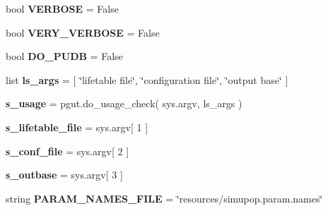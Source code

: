 \begin{DoxyCompactItemize}
\item 
bool {\bfseries V\+E\+R\+B\+O\+SE} = False\hypertarget{namespacenegui_1_1pgopsimupop_a96abe80c504eaf65df660c445e3acb51}{}\label{namespacenegui_1_1pgopsimupop_a96abe80c504eaf65df660c445e3acb51}

\item 
bool {\bfseries V\+E\+R\+Y\+\_\+\+V\+E\+R\+B\+O\+SE} = False\hypertarget{namespacenegui_1_1pgopsimupop_abf83ac5d296ea43e65ba3c2e4837b209}{}\label{namespacenegui_1_1pgopsimupop_abf83ac5d296ea43e65ba3c2e4837b209}

\item 
bool {\bfseries D\+O\+\_\+\+P\+U\+DB} = False\hypertarget{namespacenegui_1_1pgopsimupop_aad4ebdbadcdf46959a4fe2f34b95e88c}{}\label{namespacenegui_1_1pgopsimupop_aad4ebdbadcdf46959a4fe2f34b95e88c}

\item 
list {\bfseries ls\+\_\+args} = \mbox{[} \char`\"{}lifetable file\char`\"{}, \char`\"{}configuration file\char`\"{}, \char`\"{}output base\char`\"{} \mbox{]}\hypertarget{namespacenegui_1_1pgopsimupop_a46ea457904890dab8ede52052983692c}{}\label{namespacenegui_1_1pgopsimupop_a46ea457904890dab8ede52052983692c}

\item 
{\bfseries s\+\_\+usage} = pgut.\+do\+\_\+usage\+\_\+check( sys.\+argv, ls\+\_\+args )\hypertarget{namespacenegui_1_1pgopsimupop_a11e7f1bec9125f9d94dde7a90388d5bd}{}\label{namespacenegui_1_1pgopsimupop_a11e7f1bec9125f9d94dde7a90388d5bd}

\item 
{\bfseries s\+\_\+lifetable\+\_\+file} = sys.\+argv\mbox{[} 1 \mbox{]}\hypertarget{namespacenegui_1_1pgopsimupop_a35a54163d82dbd1ddbb96e7d1cf1ad92}{}\label{namespacenegui_1_1pgopsimupop_a35a54163d82dbd1ddbb96e7d1cf1ad92}

\item 
{\bfseries s\+\_\+conf\+\_\+file} = sys.\+argv\mbox{[} 2 \mbox{]}\hypertarget{namespacenegui_1_1pgopsimupop_a67afb09bc187a54d3173444bab6288e9}{}\label{namespacenegui_1_1pgopsimupop_a67afb09bc187a54d3173444bab6288e9}

\item 
{\bfseries s\+\_\+outbase} = sys.\+argv\mbox{[} 3 \mbox{]}\hypertarget{namespacenegui_1_1pgopsimupop_af359ecec2ed0e032f754420b48f0eea5}{}\label{namespacenegui_1_1pgopsimupop_af359ecec2ed0e032f754420b48f0eea5}

\item 
string {\bfseries P\+A\+R\+A\+M\+\_\+\+N\+A\+M\+E\+S\+\_\+\+F\+I\+LE} = \char`\"{}resources/simupop.\+param.\+names\char`\"{}\hypertarget{namespacenegui_1_1pgopsimupop_aad850f306d5042024ebb7ecbb882b887}{}\label{namespacenegui_1_1pgopsimupop_aad850f306d5042024ebb7ecbb882b887}


\end{DoxyCompactItemize}

